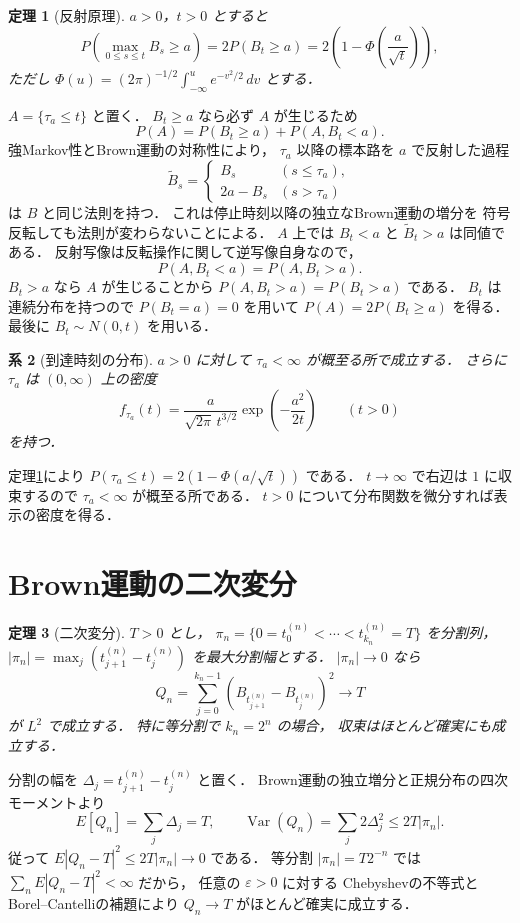\documentclass[a5paper,10pt,onecolumn]{jsarticle}
\makeatletter
\theoremstyle{mathnotetheorem}
\newtheorem{theorem}{定理}[section]
\newtheorem{corollary}[theorem]{系}
\renewcommand{\proofname}{証明}
\renewenvironment{proof}[1][\proofname]{%
  \par\pushQED{\qed}\normalfont\topsep4\p@\@plus2\p@\relax
  \trivlist\item[\hskip\labelsep\bfseries #1]\ignorespaces
}{\popQED\endtrivlist\@endpefalse}
\makeatother
\begin{document}
\begin{theorem}[反射原理]\label{thm:reflection}
$a>0$，$t>0$ とすると
\[
 P\left(\max_{0\le s\le t}B_s\ge a\right)
 =2P(B_t\ge a)
 =2\left(1-\Phi\!\left(\frac a{\sqrt t}\right)\right),
\]
ただし
$\Phi(u)=(2\pi)^{-1/2}\int_{-\infty}^u e^{-v^2/2}\,dv$
とする．
\end{theorem}
\begin{proof}
$A=\{\tau_a\le t\}$ と置く．
$B_t\ge a$ なら必ず $A$ が生じるため
\[
 P(A)=P(B_t\ge a)+P(A,B_t<a).
\]
強Markov性とBrown運動の対称性により，
$\tau_a$ 以降の標本路を $a$ で反射した過程
\[
 \widetilde B_s=
 \begin{cases}
 B_s&(s\le\tau_a),\\
 2a-B_s&(s>\tau_a)
 \end{cases}
\]
は $B$ と同じ法則を持つ．
これは停止時刻以降の独立なBrown運動の増分を
符号反転しても法則が変わらないことによる．
$A$ 上では
$B_t<a$ と $\widetilde B_t>a$ は同値である．
反射写像は反転操作に関して逆写像自身なので，
\[
 P(A,B_t<a)=P(A,B_t>a).
\]
$B_t>a$ なら $A$ が生じることから
$P(A,B_t>a)=P(B_t>a)$ である．
$B_t$ は連続分布を持つので
$P(B_t=a)=0$ を用いて
$P(A)=2P(B_t\ge a)$ を得る．
最後に $B_t\sim N(0,t)$ を用いる．
\end{proof}

\begin{corollary}[到達時刻の分布]\label{cor:hitting}
$a>0$ に対して $\tau_a<\infty$ が概至る所で成立する．
さらに $\tau_a$ は $(0,\infty)$ 上の密度
\[
 f_{\tau_a}(t)
 =\frac{a}{\sqrt{2\pi}\,t^{3/2}}
   \exp\!\left(-\frac{a^2}{2t}\right)
 \qquad(t>0)
\]
を持つ．
\end{corollary}
\begin{proof}
定理\ref{thm:reflection}により
$P(\tau_a\le t)=2(1-\Phi(a/\sqrt t))$ である．
$t\to\infty$ で右辺は $1$ に収束するので
$\tau_a<\infty$ が概至る所である．
$t>0$ について分布関数を微分すれば表示の密度を得る．
\end{proof}

\section{Brown運動の二次変分}

\begin{theorem}[二次変分]\label{thm:qv}
$T>0$ とし，
$\pi_n=\{0=t_0^{(n)}<\cdots<t_{k_n}^{(n)}=T\}$
を分割列，$|\pi_n|=\max_j(t_{j+1}^{(n)}-t_j^{(n)})$
を最大分割幅とする．
$|\pi_n|\to0$ なら
\[
 Q_n=\sum_{j=0}^{k_n-1}
 (B_{t_{j+1}^{(n)}}-B_{t_j^{(n)}})^2
 \longrightarrow T
\]
が $L^2$ で成立する．
特に等分割で $k_n=2^n$ の場合，
収束はほとんど確実にも成立する．
\end{theorem}
\begin{proof}
分割の幅を $\Delta_j=t_{j+1}^{(n)}-t_j^{(n)}$ と置く．
Brown運動の独立増分と正規分布の四次モーメントより
\[
 E[Q_n]=\sum_j\Delta_j=T,\qquad
 \operatorname{Var}(Q_n)
 =\sum_j2\Delta_j^2\le2T|\pi_n|.
\]
従って
$E|Q_n-T|^2\le2T|\pi_n|\to0$ である．
等分割 $|\pi_n|=T2^{-n}$ では
$\sum_nE|Q_n-T|^2<\infty$ だから，
任意の $\varepsilon>0$ に対する
Chebyshevの不等式とBorel--Cantelliの補題により
$Q_n\to T$ がほとんど確実に成立する．
\end{proof}
\end{document}
